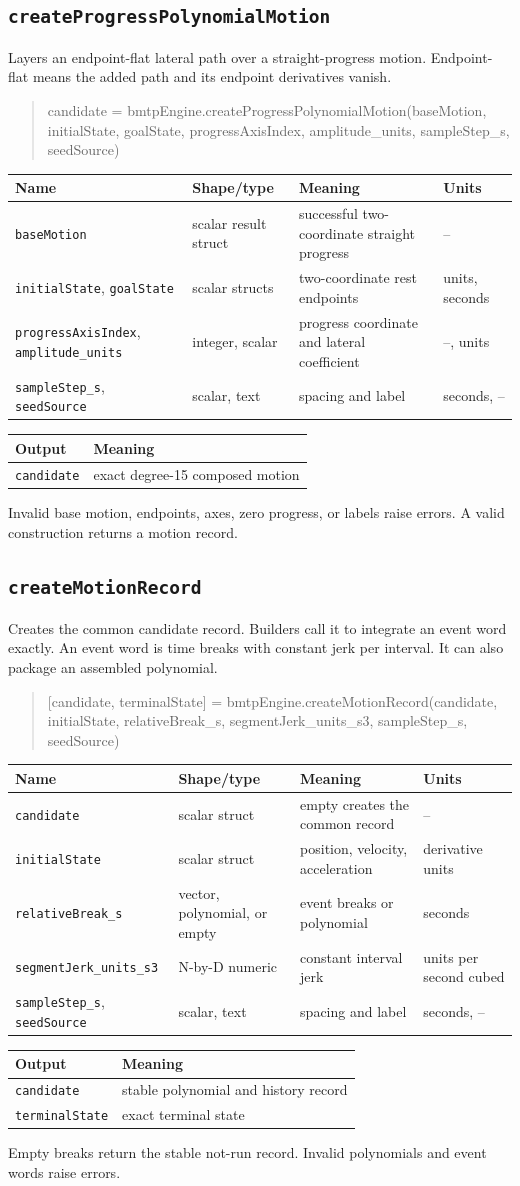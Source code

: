\documentclass[11pt]{article}
\makeatletter
\newcommand{\iface}[5]{#1\par\begin{quote}\small\ttfamily\raggedright #2\par\end{quote}
\begin{tabularx}{\textwidth}{@{}p{.24\textwidth}p{.21\textwidth}Xp{.12\textwidth}@{}}\toprule Name & Shape/type & Meaning & Units \\\midrule #3\\\bottomrule\end{tabularx}
\begin{tabularx}{\textwidth}{@{}p{.30\textwidth}X@{}}\toprule Output & Meaning \\\midrule #4\\\bottomrule\end{tabularx}
\begingroup\sloppy #5\par\endgroup\medskip}
\makeatother
\begin{document}
\subsection{\texttt{createProgressPolynomialMotion}}
\iface{Layers an endpoint-flat lateral path over a straight-progress motion.
Endpoint-flat means the added path and its endpoint derivatives vanish.}
{candidate =\allowbreak{} bmtpEngine.createProgressPolynomialMotion(baseMotion,\allowbreak{}
initialState,\allowbreak{} goalState,\allowbreak{} progressAxisIndex,\allowbreak{}
amplitude\_units,\allowbreak{} sampleStep\_s,\allowbreak{} seedSource)}
{\texttt{baseMotion} & scalar result struct & successful two-coordinate straight progress & -- \\
\texttt{initialState}, \texttt{goalState} & scalar structs & two-coordinate rest endpoints & units, seconds \\
\texttt{progressAxisIndex}, \texttt{amplitude\_units} & integer, scalar & progress coordinate and lateral coefficient & --, units \\
\texttt{sampleStep\_s}, \texttt{seedSource} & scalar, text & spacing and label & seconds, --}
{\texttt{candidate} & exact degree-15 composed motion}
{Invalid base motion, endpoints, axes, zero progress, or labels raise errors.
A valid construction returns a motion record.}

\subsection{\texttt{createMotionRecord}}
\iface{Creates the common candidate record. Builders call it to integrate an
event word exactly. An event word is time breaks with constant jerk per
interval. It can also package an assembled polynomial.}
{[candidate, terminalState] =\allowbreak{}
bmtpEngine.createMotionRecord(candidate,\allowbreak{} initialState,\allowbreak{}
relativeBreak\_s,\allowbreak{} segmentJerk\_units\_s3,\allowbreak{}
sampleStep\_s,\allowbreak{} seedSource)}
{\texttt{candidate} & scalar struct & empty creates the common record & -- \\
\texttt{initialState} & scalar struct & position, velocity, acceleration & derivative units \\
\texttt{relativeBreak\_s} & vector, polynomial, or empty & event breaks or polynomial & seconds \\
\texttt{segmentJerk\allowbreak\_units\_s3} & N-by-D numeric & constant interval jerk & units per second cubed \\
\texttt{sampleStep\_s}, \texttt{seedSource} & scalar, text & spacing and label & seconds, --}
{\texttt{candidate} & stable polynomial and history record \\
\texttt{terminalState} & exact terminal state}
{Empty breaks return the stable not-run record. Invalid polynomials and event
words raise errors.}
\end{document}
